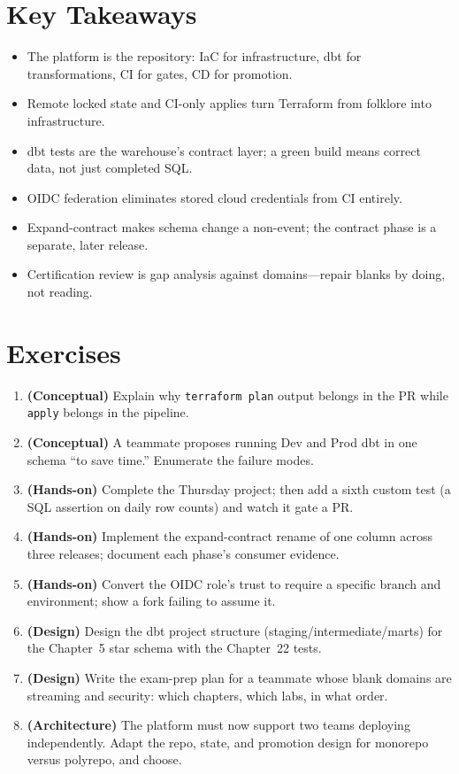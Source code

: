 \section*{Key Takeaways}
\begin{itemize}
    \item The platform is the repository: IaC for infrastructure, dbt for transformations, CI for gates, CD for promotion.
    \item Remote locked state and CI-only applies turn Terraform from folklore into infrastructure.
    \item dbt tests are the warehouse's contract layer; a green build means correct data, not just completed SQL.
    \item OIDC federation eliminates stored cloud credentials from CI entirely.
    \item Expand-contract makes schema change a non-event; the contract phase is a separate, later release.
    \item Certification review is gap analysis against domains---repair blanks by doing, not reading.
\end{itemize}

\section{Exercises}
\begin{enumerate}
    \item \textbf{(Conceptual)} Explain why \texttt{terraform plan} output belongs in the PR while \texttt{apply} belongs in the pipeline.
    \item \textbf{(Conceptual)} A teammate proposes running Dev and Prod dbt in one schema ``to save time.'' Enumerate the failure modes.
    \item \textbf{(Hands-on)} Complete the Thursday project; then add a sixth custom test (a SQL assertion on daily row counts) and watch it gate a PR.
    \item \textbf{(Hands-on)} Implement the expand-contract rename of one column across three releases; document each phase's consumer evidence.
    \item \textbf{(Hands-on)} Convert the OIDC role's trust to require a specific branch and environment; show a fork failing to assume it.
    \item \textbf{(Design)} Design the dbt project structure (staging/intermediate/marts) for the Chapter~5 star schema with the Chapter~22 tests.
    \item \textbf{(Design)} Write the exam-prep plan for a teammate whose blank domains are streaming and security: which chapters, which labs, in what order.
    \item \textbf{(Architecture)} The platform must now support two teams deploying independently. Adapt the repo, state, and promotion design for monorepo versus polyrepo, and choose.
\end{enumerate}

